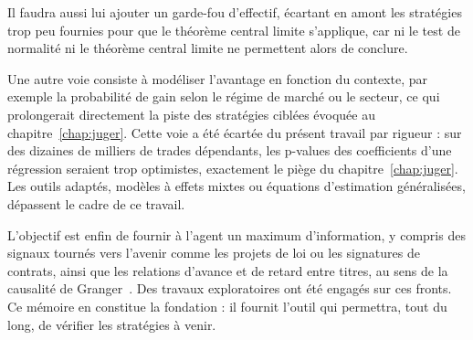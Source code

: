 Il faudra aussi lui ajouter un garde-fou d'effectif, écartant en amont les
stratégies trop peu fournies pour que le théorème central limite s'applique,
car ni le test de normalité ni le théorème central limite ne permettent alors
de conclure.

Une autre voie consiste à modéliser l'avantage en fonction du contexte, par
exemple la probabilité de gain selon le régime de marché ou le secteur, ce qui
prolongerait directement la piste des stratégies ciblées évoquée au
chapitre~\ref{chap:juger}. Cette voie a été écartée du présent travail par
rigueur : sur des dizaines de milliers de trades dépendants, les p-values des
coefficients d'une régression seraient trop optimistes, exactement le piège du
chapitre~\ref{chap:juger}. Les outils adaptés, modèles à effets mixtes ou
équations d'estimation généralisées, dépassent le cadre de ce travail.

L'objectif est enfin de fournir à l'agent un maximum d'information, y compris
des signaux tournés vers l'avenir comme les projets de loi ou les signatures de
contrats, ainsi que les relations d'avance et de retard entre titres, au sens
de la causalité de Granger~\cite{granger1969}. Des travaux exploratoires ont
été engagés sur ces fronts. Ce mémoire en constitue la fondation : il fournit
l'outil qui permettra, tout du long, de vérifier les stratégies à venir.
